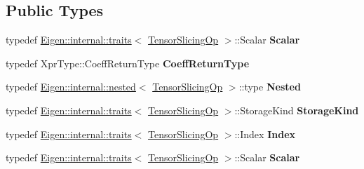 \subsection*{Public Types}
\begin{DoxyCompactItemize}
\item 
\mbox{\label{class_eigen_1_1_tensor_slicing_op_a4b17eab5a2a683f1bdf2173455832c98}} 
typedef \hyperlink{struct_eigen_1_1internal_1_1traits}{Eigen\+::internal\+::traits}$<$ \hyperlink{class_eigen_1_1_tensor_slicing_op}{Tensor\+Slicing\+Op} $>$\+::Scalar {\bfseries Scalar}
\item 
\mbox{\label{class_eigen_1_1_tensor_slicing_op_a20af07e646983a80c4fd57450c59e93c}} 
typedef Xpr\+Type\+::\+Coeff\+Return\+Type {\bfseries Coeff\+Return\+Type}
\item 
\mbox{\label{class_eigen_1_1_tensor_slicing_op_ae98b99e385ec0a0c6734a1fdeaa725e6}} 
typedef \hyperlink{struct_eigen_1_1internal_1_1nested}{Eigen\+::internal\+::nested}$<$ \hyperlink{class_eigen_1_1_tensor_slicing_op}{Tensor\+Slicing\+Op} $>$\+::type {\bfseries Nested}
\item 
\mbox{\label{class_eigen_1_1_tensor_slicing_op_a9fa7921b8ca3b05dd049132afe696294}} 
typedef \hyperlink{struct_eigen_1_1internal_1_1traits}{Eigen\+::internal\+::traits}$<$ \hyperlink{class_eigen_1_1_tensor_slicing_op}{Tensor\+Slicing\+Op} $>$\+::Storage\+Kind {\bfseries Storage\+Kind}
\item 
\mbox{\label{class_eigen_1_1_tensor_slicing_op_a58b9599622a8514c9c4f0f550cd113fa}} 
typedef \hyperlink{struct_eigen_1_1internal_1_1traits}{Eigen\+::internal\+::traits}$<$ \hyperlink{class_eigen_1_1_tensor_slicing_op}{Tensor\+Slicing\+Op} $>$\+::Index {\bfseries Index}
\item 
\mbox{\label{class_eigen_1_1_tensor_slicing_op_a4b17eab5a2a683f1bdf2173455832c98}} 
typedef \hyperlink{struct_eigen_1_1internal_1_1traits}{Eigen\+::internal\+::traits}$<$ \hyperlink{class_eigen_1_1_tensor_slicing_op}{Tensor\+Slicing\+Op} $>$\+::Scalar {\bfseries Scalar}
\item 
\mbox{\label{class_eigen_1_1_tensor_slicing_op_a20af07e646983a80c4fd57450c59e93c}} 

\end{DoxyCompactItemize}

